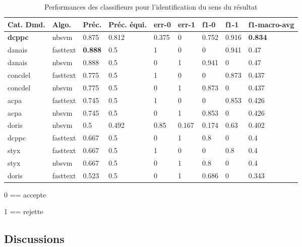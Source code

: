 \begin{table}
\scriptsize
\begin{tabular}{|l|l|l|l|l|l|l|l|l|}
\hline
\textbf{Cat. Dmd.} & \textbf{Algo.} & \textbf{Préc.}   & \textbf{Préc. équi.} & \textbf{err-0} & \textbf{err-1} & \textbf{f1-0}  & \textbf{f1-1}  & \textbf{f1-macro-avg} \\ \hline
\textbf{dcppc}       & nbsvm      & 0.875 & 0.812        & 0.375 & 0     & 0.752 & 0.916 & \textbf{0.834}        \\ \hline
danais      & fasttext   & \textbf{0.888} & 0.5          & 1     & 0     & 0     & 0.941 & 0.47         \\ \hline
danais      & nbsvm      & 0.888 & 0.5          & 0     & 1     & 0.941 & 0     & 0.47         \\ \hline
concdel     & fasttext   & 0.775 & 0.5          & 1     & 0     & 0     & 0.873 & 0.437        \\ \hline
concdel     & nbsvm      & 0.775 & 0.5          & 0     & 1     & 0.873 & 0     & 0.437        \\ \hline
acpa        & fasttext   & 0.745 & 0.5          & 1     & 0     & 0     & 0.853 & 0.426        \\ \hline
acpa        & nbsvm      & 0.745 & 0.5          & 0     & 1     & 0.853 & 0     & 0.426        \\ \hline
doris       & nbsvm      & 0.5   & 0.492        & 0.85  & 0.167 & 0.174 & 0.63  & 0.402        \\ \hline
dcppc       & fasttext   & 0.667 & 0.5          & 0     & 1     & 0.8   & 0     & 0.4          \\ \hline
styx        & fasttext   & 0.667 & 0.5          & 1     & 0     & 0     & 0.8   & 0.4          \\ \hline
styx        & nbsvm      & 0.667 & 0.5          & 0     & 1     & 0.8   & 0     & 0.4          \\ \hline
doris       & fasttext   & 0.523 & 0.5          & 0     & 1     & 0.686 & 0     & 0.343        \\ \hline
\end{tabular}
0 == accepte

1 == rejette

\caption{Performances des classifieurs pour l'identification du sens du résultat} \label{tab:sensresultat:perf-base}
\end{table}



\subsection{Discussions}
